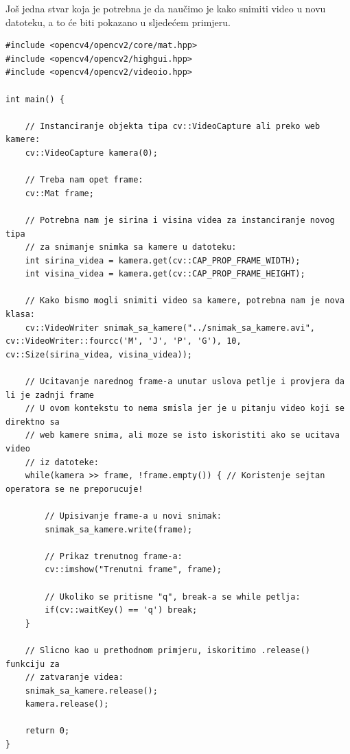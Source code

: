 \documentclass[a4paper, 12pt]{article}
\begin{document}
Još jedna stvar koja je potrebna je da naučimo je kako snimiti video u novu datoteku, a to će biti pokazano u sljedećem primjeru.

\begin{lstlisting}
#include <opencv4/opencv2/core/mat.hpp>
#include <opencv4/opencv2/highgui.hpp>
#include <opencv4/opencv2/videoio.hpp>

int main() {

    // Instanciranje objekta tipa cv::VideoCapture ali preko web kamere:
    cv::VideoCapture kamera(0);

    // Treba nam opet frame:
    cv::Mat frame;

    // Potrebna nam je sirina i visina videa za instanciranje novog tipa
    // za snimanje snimka sa kamere u datoteku:
    int sirina_videa = kamera.get(cv::CAP_PROP_FRAME_WIDTH);
    int visina_videa = kamera.get(cv::CAP_PROP_FRAME_HEIGHT);

    // Kako bismo mogli snimiti video sa kamere, potrebna nam je nova klasa:
    cv::VideoWriter snimak_sa_kamere("../snimak_sa_kamere.avi", cv::VideoWriter::fourcc('M', 'J', 'P', 'G'), 10, cv::Size(sirina_videa, visina_videa));

    // Ucitavanje narednog frame-a unutar uslova petlje i provjera da li je zadnji frame
    // U ovom kontekstu to nema smisla jer je u pitanju video koji se direktno sa
    // web kamere snima, ali moze se isto iskoristiti ako se ucitava video
    // iz datoteke:
    while(kamera >> frame, !frame.empty()) { // Koristenje sejtan operatora se ne preporucuje!

        // Upisivanje frame-a u novi snimak:
        snimak_sa_kamere.write(frame);

        // Prikaz trenutnog frame-a:
        cv::imshow("Trenutni frame", frame);

        // Ukoliko se pritisne "q", break-a se while petlja:
        if(cv::waitKey() == 'q') break;
    }

    // Slicno kao u prethodnom primjeru, iskoritimo .release() funkciju za
    // zatvaranje videa:
    snimak_sa_kamere.release();
    kamera.release();

    return 0;
}
\end{lstlisting}
\end{document}
